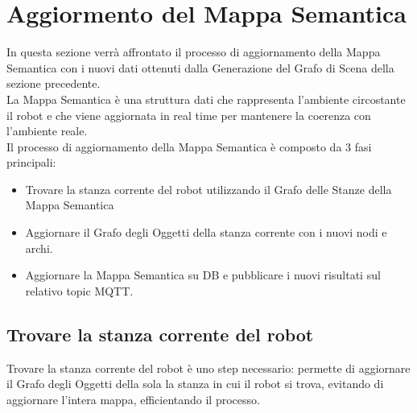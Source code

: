 \section{Aggiormento del Mappa Semantica}
In questa sezione verrà affrontato il processo di aggiornamento della Mappa Semantica con i nuovi dati ottenuti dalla Generazione del Grafo di Scena della sezione precedente.\\
La Mappa Semantica è una struttura dati che rappresenta l'ambiente circostante il robot e che viene aggiornata in real time per mantenere la coerenza con l'ambiente reale.\\
Il processo di aggiornamento della Mappa Semantica è composto da 3 fasi principali:
\begin{itemize}
	\item Trovare la stanza corrente del robot utilizzando il Grafo delle Stanze della Mappa Semantica
	\item Aggiornare il Grafo degli Oggetti della stanza corrente con i nuovi nodi e archi.
	\item Aggiornare la Mappa Semantica su DB e pubblicare i nuovi risultati sul relativo topic MQTT.
\end{itemize}

\subsection{Trovare la stanza corrente del robot}
Trovare la stanza corrente del robot è uno step necessario: permette di aggiornare il Grafo degli Oggetti della sola la stanza in cui il robot si trova, evitando di aggiornare l'intera mappa, efficientando il processo.
